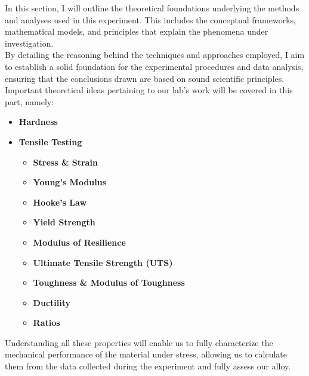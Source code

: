 \documentclass{article}
\begin{document}
    In this section, I will outline the theoretical foundations underlying the methods and analyses used in this experiment. This includes the conceptual frameworks, mathematical models, and principles that explain the phenomena under investigation.\\[8pt]
    By detailing the reasoning behind the techniques and approaches employed, I aim to establish a solid foundation for the experimental procedures and data analysis, ensuring that the conclusions drawn are based on sound scientific principles.\\[8pt]
    Important theoretical ideas pertaining to our lab's work will be covered in this part, namely:
    \begin{itemize}
        \item \textbf{Hardness}
        \item \textbf{Tensile Testing}
        \begin{itemize}
            \item \textbf{Stress \& Strain}
            \item \textbf{Young's Modulus}
            \item \textbf{Hooke's Law}
            \item \textbf{Yield Strength}
            \item \textbf{Modulus of Resilience}
            \item \textbf{Ultimate Tensile Strength (UTS)}
            \item \textbf{Toughness \& Modulus of Toughness}
            \item \textbf{Ductility}
            \item \textbf{Ratios}
        \end{itemize}
    \end{itemize}
    Understanding all these properties will enable us to fully characterize the mechanical performance of the material under stress, allowing us to calculate them from the data collected during the experiment and fully assess our alloy.
    \newpage
\end{document}
